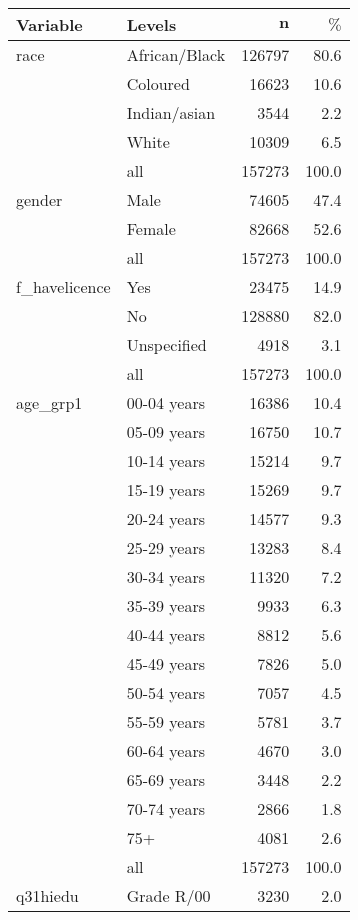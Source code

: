 \documentclass[preprint,review,authoryear, 3p,times]{elsarticle}\usepackage[]{graphicx}\usepackage[]{color}
\begin{document}
{\footnotesize
\begin{longtable}{ll|rr}
 \textbf{Variable} & \textbf{Levels} & $\mathbf{n}$ & $\mathbf{\%}$ \\ 
  \hline
race & African/Black & 126797 & 80.6 \\ 
   & Coloured & 16623 & 10.6 \\ 
   & Indian/asian & 3544 & 2.2 \\ 
   & White & 10309 & 6.5 \\ 
   \hline
 & all & 157273 & 100.0 \\ 
   \hline
\hline
gender & Male & 74605 & 47.4 \\ 
   & Female & 82668 & 52.6 \\ 
   \hline
 & all & 157273 & 100.0 \\ 
   \hline
\hline
f\_havelicence & Yes & 23475 & 14.9 \\ 
   & No & 128880 & 82.0 \\ 
   & Unspecified & 4918 & 3.1 \\ 
   \hline
 & all & 157273 & 100.0 \\ 
   \hline
\hline
age\_grp1 & 00-04 years & 16386 & 10.4 \\ 
   & 05-09 years & 16750 & 10.7 \\ 
   & 10-14 years & 15214 & 9.7 \\ 
   & 15-19 years & 15269 & 9.7 \\ 
   & 20-24 years & 14577 & 9.3 \\ 
   & 25-29 years & 13283 & 8.4 \\ 
   & 30-34 years & 11320 & 7.2 \\ 
   & 35-39 years & 9933 & 6.3 \\ 
   & 40-44 years & 8812 & 5.6 \\ 
   & 45-49 years & 7826 & 5.0 \\ 
   & 50-54 years & 7057 & 4.5 \\ 
   & 55-59 years & 5781 & 3.7 \\ 
   & 60-64 years & 4670 & 3.0 \\ 
   & 65-69 years & 3448 & 2.2 \\ 
   & 70-74 years & 2866 & 1.8 \\ 
   & 75+ & 4081 & 2.6 \\ 
   \hline
 & all & 157273 & 100.0 \\ 
   \hline
\hline
q31hiedu & Grade R/00 & 3230 & 2.0 \\ 

\end{longtable}}
\end{document}
